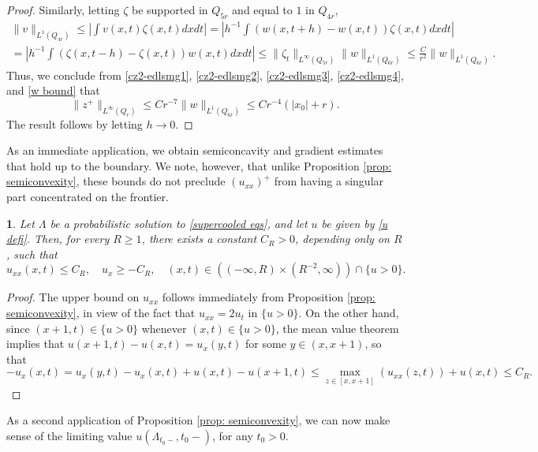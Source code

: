 \documentclass{article}
\numberwithin{equation}{section}
\numberwithin{figure}{section}
\theoremstyle{plain}
\theoremstyle{plain}
\theoremstyle{plain}
\theoremstyle{plain}
\newtheorem{lem}[thm]{\protect\lemmaname}
\theoremstyle{definition}
\theoremstyle{remark}
\providecommand{\lemmaname}{Lemma}
\begin{document}
\begin{proof}
Similarly, letting $\zeta$ be supported in $Q_{5r}$ and equal to $1$ in $Q_{4r}$,
\begin{multline}\label{cz2-edlsmg4}\|v\|_{L^1(Q_{4r})}\leq\left|\int v(x,t)\zeta(x,t)dxdt\right| =\left|h^{-1}\int(w(x,t+h)-w(x,t))\zeta(x,t)dxdt\right|\\=\left|h^{-1}\int(\zeta(x,t-h)-\zeta(x,t))w(x,t)dxdt\right| \leq \|\zeta_t\|_{L^{\infty}(Q_{5r})}\|w\|_{L^1(Q_{6r})}\leq \frac{C}{r^2}\|w\|_{L^1(Q_{6r})}.\end{multline}
Thus, we conclude from \eqref{cz2-edlsmg1}, \eqref{cz2-edlsmg2}, \eqref{cz2-edlsmg3}, \eqref{cz2-edlsmg4}, and \eqref{w bound} that
\[\|z^+\|_{L^{\infty}(Q_r)}\leq Cr^{-7}\|w\|_{L^1(Q_{6r})}\leq Cr^{-4}(|x_0|+r). \]
The result follows by letting $h \to 0$. 
\end{proof}
As an immediate application, we obtain semiconcavity and gradient estimates that hold up to the boundary. We note, however, that unlike Proposition \ref{prop: semiconvexity}, these bounds do not preclude $(u_{xx})^+$ from having a singular part concentrated on the frontier.
\begin{lem} \label{lem: uxx ux bd}  Let $\Lambda$ be a probabilistic solution to \eqref{supercooled eqs}, and let $u$ be given by \eqref{u defi}. Then, for every $R\geq 1$, there exists a constant $C_R>0$, depending only on $R$, such that
    \begin{equation}
        u_{xx}(x,t)\leq C_R, \quad  u_x \geq -C_R,\quad (x,t)\in ((-\infty,R) \times (R^{-2},\infty)) \cap\{u>0\}.
    \end{equation}
\end{lem}
\begin{proof} The upper bound on $u_{xx}$ follows immediately from Proposition \ref{prop: semiconvexity}, in view of the fact that $u_{xx}=2u_t$ in $\{u>0\}$. On the other hand, since $(x+1,t)\in \{u>0\}$ whenever $(x,t)\in \{u>0\}$, the mean value theorem implies that $u(x+1,t)-u(x,t)=u_x(y,t)$ for some $y\in (x,x+1)$, so that
\begin{equation*}
-u_x(x,t)=u_x(y,t)-u_x(x,t) +u(x,t)-u(x+1,t) \leq  \max_{z\in [x,x+1]} (u_{xx}(z,t))+u(x,t)\leq C_{R}.
\end{equation*}    
\end{proof}
As a second application of Proposition \ref{prop: semiconvexity}, we can now make sense of the limiting value $u(\Lambda_{t_0-},t_0-)$, for any $t_0>0$.
\end{document}
